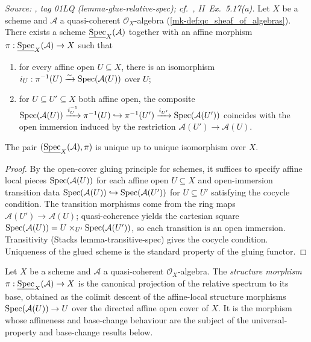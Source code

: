 \begin{theorem}
  \label{mk-thm:relative_spec_exists}
  \textit{Source: \cite{stacks-project}, tag 01LQ (lemma-glue-relative-spec);
  cf.\ \cite{hartshorne-ag}, II~Ex.~5.17(a).}
  Let \(X\) be a scheme and \(\mathcal{A}\) a quasi-coherent \(\mathcal{O}_X\)-algebra
  (\ref{mk-def:qc_sheaf_of_algebras}). There exists a scheme
  \(\underline{\operatorname{Spec}}_X(\mathcal{A})\) together with an affine morphism
  \(\pi : \underline{\operatorname{Spec}}_X(\mathcal{A}) \to X\) such that
  \begin{enumerate}
    \item for every affine open \(U \subseteq X\), there is an isomorphism
      \(i_U : \pi^{-1}(U) \xrightarrow{\sim} \operatorname{Spec}(\mathcal{A}(U))\) over \(U\);
    \item for \(U \subseteq U' \subseteq X\) both affine open, the composite
      $\operatorname{Spec}(\mathcal{A}(U)) \xrightarrow{i_U^{-1}} \pi^{-1}(U) \hookrightarrow
      \pi^{-1}(U') \xrightarrow{i_{U'}} \operatorname{Spec}(\mathcal{A}(U'))$
      coincides with the open immersion induced by the restriction
      \(\mathcal{A}(U') \to \mathcal{A}(U)\).
  \end{enumerate}
  The pair \((\underline{\operatorname{Spec}}_X(\mathcal{A}), \pi)\) is unique up to unique isomorphism
  over \(X\).
\end{theorem}

\begin{proof}
  By the open-cover gluing principle for schemes, it suffices to specify affine local
  pieces \(\operatorname{Spec}(\mathcal{A}(U))\) for each affine open \(U \subseteq X\) and
  open-immersion transition data
  \(\operatorname{Spec}(\mathcal{A}(U)) \hookrightarrow \operatorname{Spec}(\mathcal{A}(U'))\) for \(U \subseteq U'\)
  satisfying the cocycle condition. The transition morphisms come from the ring maps
  \(\mathcal{A}(U') \to \mathcal{A}(U)\); quasi-coherence yields the cartesian square
  \(\operatorname{Spec}(\mathcal{A}(U)) = U \times_{U'} \operatorname{Spec}(\mathcal{A}(U'))\), so each transition is an
  open immersion. Transitivity (Stacks lemma-transitive-spec) gives the cocycle condition.
  Uniqueness of the glued scheme is the standard property of the gluing functor.
\end{proof}

\begin{definition}
  \label{mk-def:relspec_structure_morphism}
  \leanok

  Let \(X\) be a scheme and \(\mathcal{A}\) a quasi-coherent \(\mathcal{O}_X\)-algebra.
  The \emph{structure morphism}
  \(\pi : \underline{\operatorname{Spec}}_X(\mathcal{A}) \to X\) is the canonical projection of the
  relative spectrum to its base, obtained as the colimit descent of the affine-local
  structure morphisms \(\operatorname{Spec}(\mathcal{A}(U)) \to U\) over the directed affine open
  cover of \(X\). It is the morphism whose affineness and base-change behaviour are the
  subject of the universal-property and base-change results below.
\end{definition}

